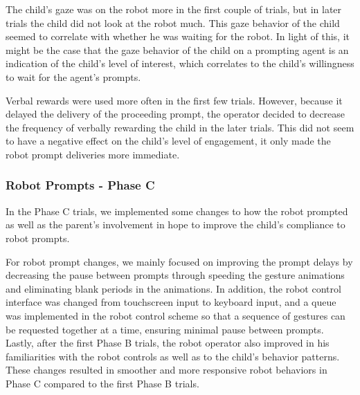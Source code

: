 The child's gaze was on the robot more in the first couple of trials, but in later trials the child did not look at the robot much.  This gaze behavior of the child seemed to correlate with whether he was waiting for the robot.  In light of this, it might be the case that the gaze behavior of the child on a prompting agent is an indication of the child's level of interest, which correlates to the child's willingness to wait for the agent's prompts.

Verbal rewards were used more often in the first few trials.  However, because it delayed the delivery of the proceeding prompt, the operator decided to decrease the frequency of verbally rewarding the child in the later trials.  This did not seem to have a negative effect on the child's level of engagement, it only made the robot prompt deliveries more immediate.

\subsubsection{Robot Prompts - Phase C}
In the Phase C trials, we implemented some changes to how the robot prompted as well as the parent's involvement in hope to improve the child's compliance to robot prompts.

For robot prompt changes, we mainly focused on improving the prompt delays by decreasing the pause between prompts through speeding the gesture animations and eliminating blank periods in the animations.  In addition, the robot control interface was changed from touchscreen input to keyboard input, and a queue was implemented in the robot control scheme so that a sequence of gestures can be requested together at a time, ensuring minimal pause between prompts.  Lastly, after the first Phase B trials, the robot operator also improved in his familiarities with the robot controls as well as to the child's behavior patterns.  These changes resulted in smoother and more responsive robot behaviors in Phase C compared to the first Phase B trials.

